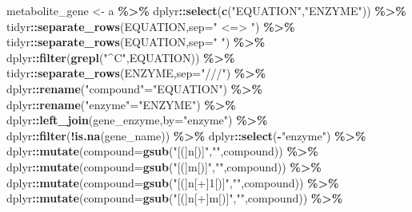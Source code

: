 \documentclass[
]{book}
\newenvironment{Shaded}{\begin{snugshade}}{\end{snugshade}}
\newcommand{\AttributeTok}[1]{\textcolor[rgb]{0.13,0.29,0.53}{#1}}
\newcommand{\FunctionTok}[1]{\textcolor[rgb]{0.13,0.29,0.53}{\textbf{#1}}}
\newcommand{\NormalTok}[1]{#1}
\newcommand{\OtherTok}[1]{\textcolor[rgb]{0.56,0.35,0.01}{#1}}
\newcommand{\SpecialCharTok}[1]{\textcolor[rgb]{0.81,0.36,0.00}{\textbf{#1}}}
\newcommand{\StringTok}[1]{\textcolor[rgb]{0.31,0.60,0.02}{#1}}
\begin{document}
\begin{Shaded}
\begin{Highlighting}[]
\NormalTok{metabolite\_gene }\OtherTok{\textless{}{-}}\NormalTok{ a }\SpecialCharTok{\%\textgreater{}\%}
\NormalTok{  dplyr}\SpecialCharTok{::}\FunctionTok{select}\NormalTok{(}\FunctionTok{c}\NormalTok{(}\StringTok{"EQUATION"}\NormalTok{,}\StringTok{"ENZYME"}\NormalTok{)) }\SpecialCharTok{\%\textgreater{}\%}
\NormalTok{  tidyr}\SpecialCharTok{::}\FunctionTok{separate\_rows}\NormalTok{(EQUATION,}\AttributeTok{sep=}\StringTok{" \textless{}=\textgreater{} "}\NormalTok{) }\SpecialCharTok{\%\textgreater{}\%}
\NormalTok{  tidyr}\SpecialCharTok{::}\FunctionTok{separate\_rows}\NormalTok{(EQUATION,}\AttributeTok{sep=}\StringTok{" "}\NormalTok{) }\SpecialCharTok{\%\textgreater{}\%}
\NormalTok{  dplyr}\SpecialCharTok{::}\FunctionTok{filter}\NormalTok{(}\FunctionTok{grepl}\NormalTok{(}\StringTok{"\^{}C"}\NormalTok{,EQUATION)) }\SpecialCharTok{\%\textgreater{}\%}
\NormalTok{  tidyr}\SpecialCharTok{::}\FunctionTok{separate\_rows}\NormalTok{(ENZYME,}\AttributeTok{sep=}\StringTok{"///"}\NormalTok{) }\SpecialCharTok{\%\textgreater{}\%}
\NormalTok{  dplyr}\SpecialCharTok{::}\FunctionTok{rename}\NormalTok{(}\StringTok{"compound"}\OtherTok{=}\StringTok{"EQUATION"}\NormalTok{) }\SpecialCharTok{\%\textgreater{}\%}
\NormalTok{  dplyr}\SpecialCharTok{::}\FunctionTok{rename}\NormalTok{(}\StringTok{"enzyme"}\OtherTok{=}\StringTok{"ENZYME"}\NormalTok{) }\SpecialCharTok{\%\textgreater{}\%}
\NormalTok{  dplyr}\SpecialCharTok{::}\FunctionTok{left\_join}\NormalTok{(gene\_enzyme,}\AttributeTok{by=}\StringTok{"enzyme"}\NormalTok{) }\SpecialCharTok{\%\textgreater{}\%}
\NormalTok{  dplyr}\SpecialCharTok{::}\FunctionTok{filter}\NormalTok{(}\SpecialCharTok{!}\FunctionTok{is.na}\NormalTok{(gene\_name)) }\SpecialCharTok{\%\textgreater{}\%}
\NormalTok{  dplyr}\SpecialCharTok{::}\FunctionTok{select}\NormalTok{(}\SpecialCharTok{{-}}\StringTok{"enzyme"}\NormalTok{) }\SpecialCharTok{\%\textgreater{}\%}
\NormalTok{  dplyr}\SpecialCharTok{::}\FunctionTok{mutate}\NormalTok{(}\AttributeTok{compound=}\FunctionTok{gsub}\NormalTok{(}\StringTok{"[(]n[)]"}\NormalTok{,}\StringTok{""}\NormalTok{,compound)) }\SpecialCharTok{\%\textgreater{}\%}
\NormalTok{  dplyr}\SpecialCharTok{::}\FunctionTok{mutate}\NormalTok{(}\AttributeTok{compound=}\FunctionTok{gsub}\NormalTok{(}\StringTok{"[(]m[)]"}\NormalTok{,}\StringTok{""}\NormalTok{,compound)) }\SpecialCharTok{\%\textgreater{}\%}
\NormalTok{  dplyr}\SpecialCharTok{::}\FunctionTok{mutate}\NormalTok{(}\AttributeTok{compound=}\FunctionTok{gsub}\NormalTok{(}\StringTok{"[(]n[+]1[)]"}\NormalTok{,}\StringTok{""}\NormalTok{,compound)) }\SpecialCharTok{\%\textgreater{}\%}
\NormalTok{  dplyr}\SpecialCharTok{::}\FunctionTok{mutate}\NormalTok{(}\AttributeTok{compound=}\FunctionTok{gsub}\NormalTok{(}\StringTok{"[(]n[+]m[)]"}\NormalTok{,}\StringTok{""}\NormalTok{,compound)) }\SpecialCharTok{\%\textgreater{}\%}

\end{Highlighting}
\end{Shaded}
\end{document}
